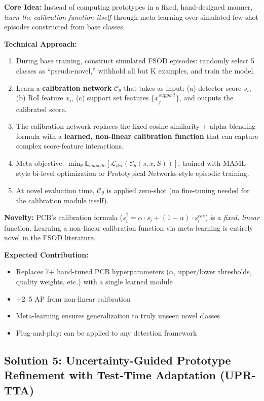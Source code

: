 \documentclass[11pt,a4paper]{article}
\begin{document}
\textbf{Core Idea:} Instead of computing prototypes in a fixed, hand-designed manner, \textit{learn the calibration function itself} through meta-learning over simulated few-shot episodes constructed from base classes.

\textbf{Technical Approach:}
\begin{enumerate}[nosep]
    \item During base training, construct simulated FSOD episodes: randomly select 5 classes as ``pseudo-novel,'' withhold all but K examples, and train the model.
    \item Learn a \textbf{calibration network} $\mathcal{C}_\theta$ that takes as input: (a) detector score $s_i$, (b) RoI feature $x_i$, (c) support set features $\{x_j^{support}\}$, and outputs the calibrated score.
    \item The calibration network replaces the fixed cosine-similarity + alpha-blending formula with a \textbf{learned, non-linear calibration function} that can capture complex score-feature interactions.
    \item Meta-objective: $\min_\theta \mathbb{E}_{episode}\left[\mathcal{L}_{det}(\mathcal{C}_\theta(s, x, S))\right]$, trained with MAML-style bi-level optimization or Prototypical Networks-style episodic training.
    \item At novel evaluation time, $\mathcal{C}_\theta$ is applied zero-shot (no fine-tuning needed for the calibration module itself).
\end{enumerate}

\textbf{Novelty:} PCB's calibration formula ($s_i^\dagger = \alpha \cdot s_i + (1-\alpha) \cdot s_i^{cos}$) is a \textit{fixed, linear} function. Learning a non-linear calibration function via meta-learning is entirely novel in the FSOD literature.

\textbf{Expected Contribution:}
\begin{itemize}[nosep]
    \item Replaces 7+ hand-tuned PCB hyperparameters ($\alpha$, upper/lower thresholds, quality weights, etc.) with a single learned module
    \item +2--5 AP from non-linear calibration
    \item Meta-learning ensures generalization to truly unseen novel classes
    \item Plug-and-play: can be applied to any detection framework
\end{itemize}

\subsection{Solution 5: Uncertainty-Guided Prototype Refinement with Test-Time Adaptation (UPR-TTA)}
\end{document}
